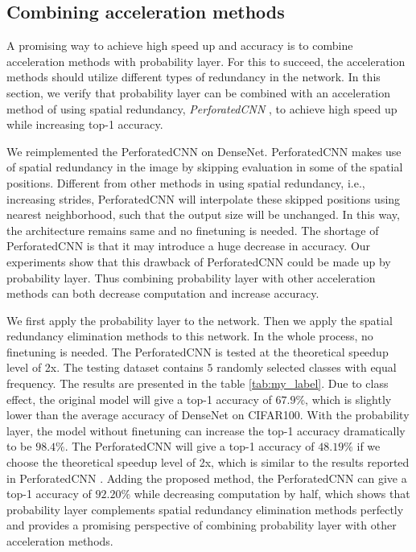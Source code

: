 \documentclass[pageno]{jpaper}
\begin{document}
\subsection{Combining acceleration methods}
A promising way to achieve high speed up and accuracy is to combine acceleration methods with probability layer. For this to succeed, the acceleration methods should utilize different types of redundancy in the network. In this section, we verify that probability layer can be combined with an acceleration method of using spatial redundancy, \textit{PerforatedCNN} \cite{figurnov2016perforatedcnns}, to achieve high speed up while increasing top-1 accuracy.

We reimplemented the PerforatedCNN \cite{figurnov2016perforatedcnns} on DenseNet. PerforatedCNN makes use of spatial redundancy in the image by skipping evaluation in some of the spatial positions. Different from other methods in using spatial redundancy, i.e., increasing strides, PerforatedCNN will interpolate these skipped positions using nearest neighborhood, such that the output size will be unchanged. In this way, the architecture remains same and no finetuning is needed. The shortage of PerforatedCNN is that it may introduce a huge decrease in accuracy. Our experiments show that this drawback of PerforatedCNN could be made up by probability layer. Thus combining probability layer with other acceleration methods can both decrease computation and increase accuracy.

We first apply the probability layer to the network. Then we apply the spatial redundancy elimination methods to this network. In the whole process, no finetuning is needed. The PerforatedCNN is tested at the theoretical speedup level of 2x. The testing dataset contains $5$ randomly selected classes with equal frequency. The results are presented in the table \ref{tab:my_label}. Due to class effect, the original model will give a top-1 accuracy of $67.9\%$, which is slightly lower than the average accuracy of DenseNet on CIFAR100. With the probability layer, the model without finetuning can increase the top-1 accuracy dramatically to be $98.4\%$. The PerforatedCNN will give a top-1 accuracy of $48.19\%$ if we choose the theoretical speedup level of 2x, which is similar to the results reported in PerforatedCNN \cite{figurnov2016perforatedcnns}. Adding the proposed method, the PerforatedCNN can give a top-1 accuracy of $92.20\%$ while decreasing computation by half, which shows that probability layer complements spatial redundancy elimination methods perfectly and provides a promising perspective of combining probability layer with other acceleration methods.
\end{document}
